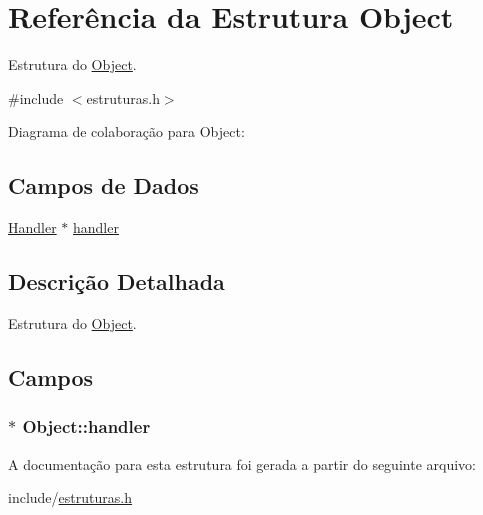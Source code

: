 \hypertarget{struct_object}{}\section{Referência da Estrutura Object}
\label{struct_object}


Estrutura do \hyperlink{struct_object}{Object}.  




{\ttfamily \#include $<$estruturas.\+h$>$}



Diagrama de colaboração para Object\+:
\subsection*{Campos de Dados}
\begin{DoxyCompactItemize}
\item 
\hyperlink{struct_handler}{Handler} $\ast$ \hyperlink{struct_object_aad3f75cdc4a1d18ef18974c6106d64ad}{handler}
\end{DoxyCompactItemize}


\subsection{Descrição Detalhada}
Estrutura do \hyperlink{struct_object}{Object}. 

\subsection{Campos}
\subsubsection[{\texorpdfstring{handler}{handler}}]{$\ast$ Object\+::handler}\hypertarget{struct_object_aad3f75cdc4a1d18ef18974c6106d64ad}{}\label{struct_object_aad3f75cdc4a1d18ef18974c6106d64ad}


A documentação para esta estrutura foi gerada a partir do seguinte arquivo\+:\begin{DoxyCompactItemize}
\item 
include/\hyperlink{estruturas_8h}{estruturas.\+h}\end{DoxyCompactItemize}
